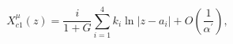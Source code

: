\begin{equation}
X_{c1}^{\mu }(z)=\frac{i}{1+G}\overset{4}{\underset{i=1}{\sum }}k_{i}\ln
\left\vert z-a_{i}\right\vert +O(\frac{1}{\alpha ^{\prime }}),
\end{equation}%
